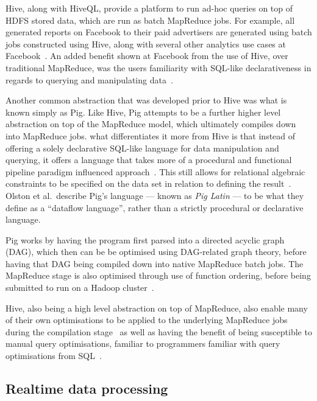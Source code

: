 Hive, along with HiveQL, provide a platform to run ad-hoc queries on top of HDFS stored data, which are run as batch
MapReduce jobs. For example, all generated reports on Facebook to their paid advertisers are generated using batch jobs
constructed using Hive, along with several other analytics use cases at Facebook~\cite{thusoo2010data}. An added benefit
shown at Facebook from the use of Hive, over traditional MapReduce, was the users familiarity with SQL-like
declarativeness in regards to querying and manipulating data~\cite{borthakur2011apache}.

Another common abstraction that was developed prior to Hive was what is known simply as Pig. Like Hive, Pig attempts to
be a further higher level abstraction on top of the MapReduce model, which ultimately compiles down into MapReduce jobs.
what differentiates it more from Hive is that instead of offering a solely declarative SQL-like language for data
manipulation and querying, it offers a language that takes more of a procedural and functional pipeline paradigm
influenced approach~\cite{olston2011nova}. This still allows for relational algebraic constraints to be specified on the data set in relation to defining the
result~\cite{olston2008pig}. Olston et al.\ describe Pig's language --- known as \textit{Pig Latin} --- to be what they
define as a ``dataflow language'', rather than a strictly procedural or declarative language.

Pig works by having the program first parsed into a directed acyclic graph (DAG), which then can be be optimised using
DAG-related graph theory, before having that DAG being compiled down into native MapReduce batch jobs. The MapReduce
stage is also optimised through use of function ordering, before being submitted to run on a Hadoop
cluster~\cite{stewart2011comparing}.

Hive, also being a high level abstraction on top of MapReduce, also enable many of their own
optimisations to be applied to the underlying MapReduce jobs during the compilation
stage~\cite{gates2009building,thusoo2010hive} as well as having the benefit of being susceptible to manual query
optimisations, familiar to programmers familiar with query optimisations from SQL~\cite{gruenheid2011query}.






\subsection{Realtime data processing} %
\label{sub:realtime_data_processing}


